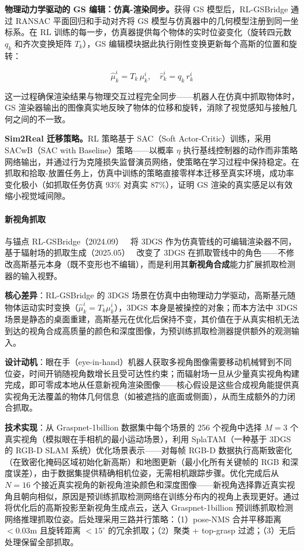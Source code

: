 \textbf{物理动力学驱动的 GS 编辑：仿真-渲染同步。}获得 GS 模型后，RL-GSBridge 通过 RANSAC 平面回归和手动对齐将 GS 模型与仿真器中的几何模型注册到同一坐标系。在 RL 训练的每一步，仿真器提供每个物体的实时位姿变化（旋转四元数 $q_k$ 和齐次变换矩阵 $T_k$），GS 编辑模块据此执行刚性变换更新每个高斯的位置和旋转：

\begin{equation}
    \hat{\mu}_k^i = T_k\,\mu_k^i, \quad \hat{r}_k^i = q_k\,r_k^i
\end{equation}

这一过程确保渲染结果与物理交互过程完全同步——机器人在仿真中抓取物体时，GS 渲染器输出的图像真实地反映了物体的位移和旋转，消除了视觉感知与接触几何之间的不一致。

\textbf{Sim2Real 迁移策略。}RL 策略基于 SAC（Soft Actor-Critic）训练，采用 SACwB（SAC with Baseline）策略——以概率 $\eta$ 执行基线控制器的动作而非策略网络输出，并通过行为克隆损失监督演员网络，使策略在学习过程中保持稳定。在抓取和拾取-放置任务上，仿真中训练的策略直接零样本迁移至真实环境，成功率变化极小（如抓取任务仿真 93\% 对真实 87\%），证明 GS 渲染的真实感足以有效缩小视觉域间隙。

\paragraph{新视角抓取}

与锚点 RL-GSBridge（2024.09）~\cite{2409_20291} 将 3DGS 作为仿真管线的可编辑渲染器不同，基于辐射场的抓取生成（2025.05）~\cite{2505_11467} 改变了 3DGS 在抓取管线中的角色——不修改高斯基元本身（既不变形也不编辑），而是利用其\textbf{新视角合成}能力扩展抓取检测器的输入视野。

\textbf{核心差异}：RL-GSBridge 的 3DGS 场景在仿真中由物理动力学驱动，高斯基元随物体运动实时变换（$\hat{\mu}_k^i = T_k \mu_k^i$），3DGS 本身是被操控的对象；而本方法中 3DGS 场景是静态的桌面重建，高斯基元在优化后保持不变，其价值在于从真实相机无法到达的视角合成高质量的颜色和深度图像，为预训练抓取检测器提供额外的观测输入。

\textbf{设计动机}：眼在手（eye-in-hand）机器人获取多视角图像需要移动机械臂到不同位姿，时间开销随视角数增长且受可达性约束；而辐射场一旦从少量真实视角构建完成，即可零成本地从任意新视角渲染图像——核心假设是这些合成视角能提供真实视角无法覆盖的物体几何信息（如被遮挡的底面或侧面），从而生成额外的力闭合抓取。

\textbf{技术实现}：从 Graspnet-1billion 数据集中每个场景的 256 个视角中选择 $M=3$ 个真实视角（模拟眼在手相机的最小运动场景），利用 SplaTAM（一种基于 3DGS 的 RGB-D SLAM 系统）优化场景表示——对每帧 RGB-D 数据执行高斯致密化（在致密化掩码区域初始化新高斯）和地图更新（最小化所有关键帧的 RGB 和深度误差），由于数据集提供精确相机位姿，无需相机跟踪步骤。优化完成后从 $N=16$ 个接近真实视角的新视角渲染颜色和深度图像——新视角选择靠近真实视角且朝向相似，原因是预训练抓取检测网络在训练分布内的视角上表现更好。通过将优化后的高斯投影至新视角生成点云，送入 Graspnet-1billion 预训练抓取检测网络推理抓取位姿。后处理采用三路并行策略：（1）pose-NMS 合并平移距离 $< 0.03\text{m}$ 且旋转距离 $< 15^\circ$ 的冗余抓取；（2）聚类 + top-grasp 过滤；（3）无后处理保留全部抓取。

